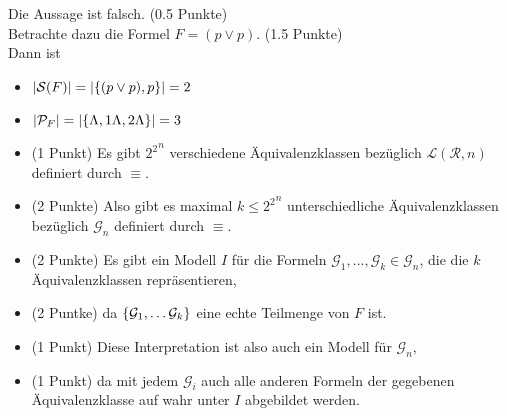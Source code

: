 \documentclass[a4paper, 11pt, ngerman]{scrartcl}
\begin{document}
\vspace{6pt}

Die Aussage ist falsch. (0.5 Punkte) \\
Betrachte dazu die Formel $F = (p \lor p)$. (1.5 Punkte) \\ Dann ist
\begin{itemize}
	\item $\left| \mathcal{S}(F) \right| = \left| \{ (p \lor p), p \} \right| = 2$
	\item $\left| \mathcal{P}_F \right|  = \left| \{ \Lambda, 1 \Lambda, 2 \Lambda \} \right| = 3$
\end{itemize}

\vspace{6pt}

\begin{itemize}
\item (1 Punkt) Es gibt ${2^2}^n$ verschiedene Äquivalenzklassen bezüglich $\mathcal{L}(\mathcal{R}, n)$ definiert durch $\equiv$. 
\item (2 Punkte) Also gibt es maximal $k \leq {2^2}^n$ unterschiedliche Äquivalenzklassen bezüglich $\mathcal{G}_n$ definiert durch $\equiv$.
\item (2 Punkte) Es gibt ein Modell $I$ für die Formeln $\mathcal{G}_1 , \dots, \mathcal{G}_k \in \mathscr{G}_n$, die die $k$ Äquivalenzklassen repräsentieren, 
\item (2 Puntke) da $\{ \mathcal{G}_1 , \dots \mathcal{G}_k \}$ eine echte Teilmenge von $F$ ist. \\
\item (1 Punkt) Diese Interpretation ist also auch ein Modell für $\mathscr{G}_n$, 
\item (1 Punkt) da mit jedem $\mathcal{G}_i$ auch alle anderen Formeln der gegebenen Äquivalenzklasse auf wahr unter $I$ abgebildet werden.
\end{itemize}
\end{document}
